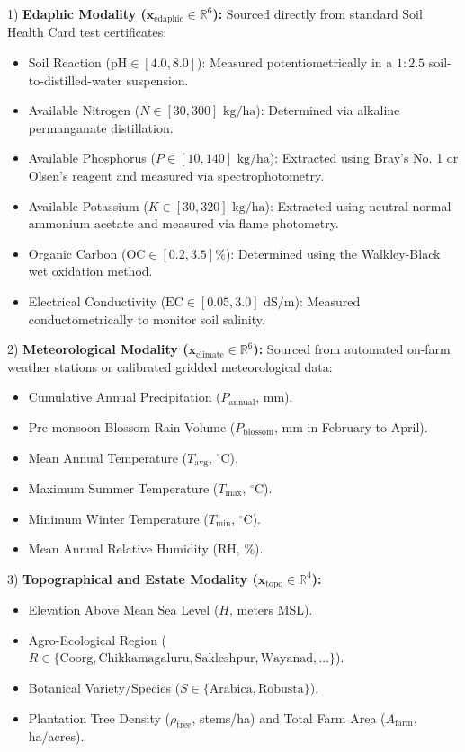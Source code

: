 \documentclass[conference]{IEEEtran}
\begin{document}
1) \textbf{Edaphic Modality ($\mathbf{x}_{\text{edaphic}} \in \mathbb{R}^6$):} Sourced directly from standard Soil Health Card test certificates:
\begin{itemize}
    \item Soil Reaction ($\text{pH} \in [4.0, 8.0]$): Measured potentiometrically in a $1:2.5$ soil-to-distilled-water suspension.
    \item Available Nitrogen ($N \in [30, 300]\text{ kg/ha}$): Determined via alkaline permanganate distillation.
    \item Available Phosphorus ($P \in [10, 140]\text{ kg/ha}$): Extracted using Bray's No. 1 or Olsen's reagent and measured via spectrophotometry.
    \item Available Potassium ($K \in [30, 320]\text{ kg/ha}$): Extracted using neutral normal ammonium acetate and measured via flame photometry.
    \item Organic Carbon ($\text{OC} \in [0.2, 3.5]\%$): Determined using the Walkley-Black wet oxidation method.
    \item Electrical Conductivity ($\text{EC} \in [0.05, 3.0]\text{ dS/m}$): Measured conductometrically to monitor soil salinity.
\end{itemize}

2) \textbf{Meteorological Modality ($\mathbf{x}_{\text{climate}} \in \mathbb{R}^6$):} Sourced from automated on-farm weather stations or calibrated gridded meteorological data:
\begin{itemize}
    \item Cumulative Annual Precipitation ($P_{\text{annual}}$, mm).
    \item Pre-monsoon Blossom Rain Volume ($P_{\text{blossom}}$, mm in February to April).
    \item Mean Annual Temperature ($T_{\text{avg}}$, $^\circ\text{C}$).
    \item Maximum Summer Temperature ($T_{\text{max}}$, $^\circ\text{C}$).
    \item Minimum Winter Temperature ($T_{\text{min}}$, $^\circ\text{C}$).
    \item Mean Annual Relative Humidity ($\text{RH}$, \%).
\end{itemize}

3) \textbf{Topographical and Estate Modality ($\mathbf{x}_{\text{topo}} \in \mathbb{R}^4$):}
\begin{itemize}
    \item Elevation Above Mean Sea Level ($H$, meters MSL).
    \item Agro-Ecological Region ($R \in \{\text{Coorg}, \text{Chikkamagaluru}, \text{Sakleshpur}, \text{Wayanad}, \dots\}$).
    \item Botanical Variety/Species ($S \in \{\text{Arabica}, \text{Robusta}\}$).
    \item Plantation Tree Density ($\rho_{\text{tree}}$, stems/ha) and Total Farm Area ($A_{\text{farm}}$, ha/acres).
\end{itemize}
\end{document}
